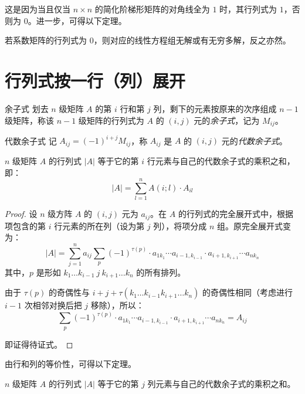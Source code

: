 这是因为当且仅当 $n \times n$ 的简化阶梯形矩阵的对角线全为 $1$ 时，其行列式为 $1$，否则为 $0$。进一步，可得以下定理。

\begin{theorem}
	若系数矩阵的行列式为 $0$，则对应的线性方程组无解或有无穷多解，反之亦然。
\end{theorem}

\section{行列式按一行（列）展开}

\begin{definition}{余子式}
	划去 $n$ 级矩阵 $A$ 的第 $i$ 行和第 $j$ 列，剩下的元素按原来的次序组成 $n - 1$ 级矩阵，称该 $n - 1$ 级矩阵的行列式为 $A$ 的 $(i, j)$ 元的\emph{余子式}，记为 $M_{ij}$。
\end{definition}

\begin{definition}{代数余子式}
	记 $A_{ij} = (-1)^{i + j} M_{ij}$，称 $A_{ij}$ 是 $A$ 的 $(i, j)$ 元的\emph{代数余子式}。
\end{definition}

\begin{theorem}
	$n$ 级矩阵 $A$ 的行列式 $|A|$ 等于它的第 $i$ 行元素与自己的代数余子式的乘积之和，即：
	$$
	|A| = \sum\limits_{l = 1}^n A(i; l) \cdot A_{il}
	$$
\end{theorem}

\begin{proof}
	设 $n$ 级方阵 $A$ 的 $(i, j)$ 元为 $a_{ij}$。在 $A$ 的行列式的完全展开式中，根据项包含的第 $i$ 行元素的所在列（设为第 $j$ 列），将项分成 $n$ 组。原完全展开式变为：
	$$
	|A| = \sum\limits_{j = 1}^n a_{ij} \sum\limits_{p} (-1)^{\tau(p)} \cdot a_{1 k_1} \cdots a_{i - 1, k_{i - 1}} \cdot a_{i + 1, k_{i + 1}} \cdots a_{n k_n}
	$$
	其中，$p$ 是形如 $k_1 \ldots k_{i - 1}~j~k_{i + 1} \ldots k_n$ 的所有排列。

	由于 $\tau(p)$ 的奇偶性与 $i + j + \tau(k_1 \ldots k_{i - 1} k_{i + 1} \ldots k_n)$ 的奇偶性相同（考虑进行 $i - 1$ 次相邻对换后把 $j$ 移除），所以：
	$$
	\sum\limits_{p} (-1)^{\tau(p)} \cdot a_{1 k_1} \cdots a_{i - 1, k_{i - 1}} \cdot a_{i + 1, k_{i + 1}} \cdots a_{n k_n} = A_{ij}
	$$

	即证得待证式。
\end{proof}

由行和列的等价性，可得以下定理。

\begin{theorem}
	$n$ 级矩阵 $A$ 的行列式 $|A|$ 等于它的第 $j$ 列元素与自己的代数余子式的乘积之和。
\end{theorem}

